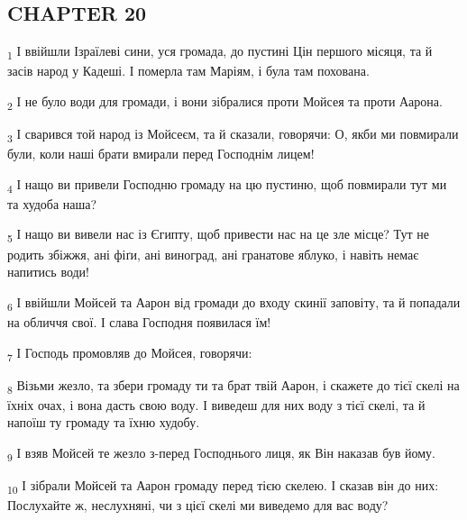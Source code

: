 \subsection{CHAPTER 20}
\begin{tcolorbox}
\textsubscript{1} І ввійшли Ізраїлеві сини, уся громада, до пустині Цін першого місяця, та й засів народ у Кадеші. І померла там Маріям, і була там похована.
\end{tcolorbox}
\begin{tcolorbox}
\textsubscript{2} І не було води для громади, і вони зібралися проти Мойсея та проти Аарона.
\end{tcolorbox}
\begin{tcolorbox}
\textsubscript{3} І сварився той народ із Мойсеєм, та й сказали, говорячи: О, якби ми повмирали були, коли наші брати вмирали перед Господнім лицем!
\end{tcolorbox}
\begin{tcolorbox}
\textsubscript{4} І нащо ви привели Господню громаду на цю пустиню, щоб повмирали тут ми та худоба наша?
\end{tcolorbox}
\begin{tcolorbox}
\textsubscript{5} І нащо ви вивели нас із Єгипту, щоб привести нас на це зле місце? Тут не родить збіжжя, ані фіґи, ані виноград, ані гранатове яблуко, і навіть немає напитись води!
\end{tcolorbox}
\begin{tcolorbox}
\textsubscript{6} І ввійшли Мойсей та Аарон від громади до входу скинії заповіту, та й попадали на обличчя свої. І слава Господня появилася їм!
\end{tcolorbox}
\begin{tcolorbox}
\textsubscript{7} І Господь промовляв до Мойсея, говорячи:
\end{tcolorbox}
\begin{tcolorbox}
\textsubscript{8} Візьми жезло, та збери громаду ти та брат твій Аарон, і скажете до тієї скелі на їхніх очах, і вона дасть свою воду. І виведеш для них воду з тієї скелі, та й напоїш ту громаду та їхню худобу.
\end{tcolorbox}
\begin{tcolorbox}
\textsubscript{9} І взяв Мойсей те жезло з-перед Господнього лиця, як Він наказав був йому.
\end{tcolorbox}
\begin{tcolorbox}
\textsubscript{10} І зібрали Мойсей та Аарон громаду перед тією скелею. І сказав він до них: Послухайте ж, неслухняні, чи з цієї скелі ми виведемо для вас воду?
\end{tcolorbox}
